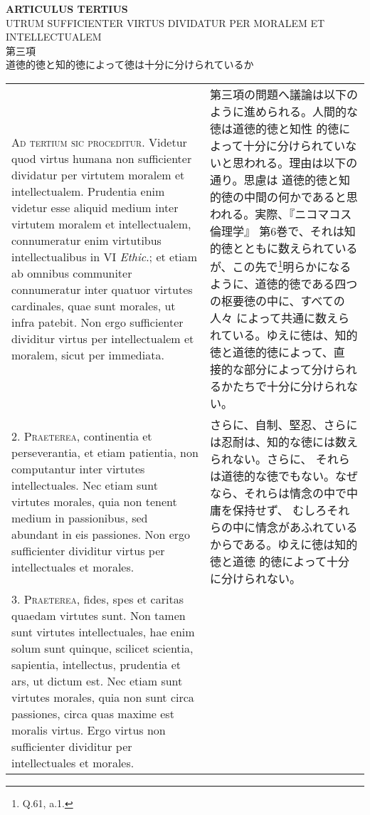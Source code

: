 \documentclass[10pt]{jsarticle}
\begin{document}
\begin{center}
{\Large {\bf ARTICULUS TERTIUS}}\\
{\large UTRUM SUFFICIENTER VIRTUS DIVIDATUR PER MORALEM ET INTELLECTUALEM}\\
{\Large 第三項\\道徳的徳と知的徳によって徳は十分に分けられているか}
\end{center}

\begin{longtable}{p{21em}p{21em}}
{\scshape Ad tertium sic proceditur}. Videtur quod virtus humana non
sufficienter dividatur per virtutem moralem et
intellectualem. Prudentia enim videtur esse aliquid medium inter
virtutem moralem et intellectualem, connumeratur enim virtutibus
intellectualibus in VI {\itshape Ethic}.; et etiam ab omnibus
communiter connumeratur inter quatuor virtutes cardinales, quae sunt
morales, ut infra patebit. Non ergo sufficienter dividitur virtus per
intellectualem et moralem, sicut per immediata.

&

第三項の問題へ議論は以下のように進められる。人間的な徳は道徳的徳と知性
的徳によって十分に分けられていないと思われる。理由は以下の通り。思慮は
道徳的徳と知的徳の中間の何かであると思われる。実際、『ニコマコス倫理学』
第6巻で、それは知的徳とともに数えられているが、この先で\footnote{Q.61,
a.1.}明らかになるように、道徳的徳である四つの枢要徳の中に、すべての人々
によって共通に数えられている。ゆえに徳は、知的徳と道徳的徳によって、直
接的な部分によって分けられるかたちで十分に分けられない。

\\



2. {\scshape Praeterea}, continentia et perseverantia, et etiam
patientia, non computantur inter virtutes intellectuales. Nec etiam
sunt virtutes morales, quia non tenent medium in passionibus, sed
abundant in eis passiones. Non ergo sufficienter dividitur virtus per
intellectuales et morales.

&

さらに、自制、堅忍、さらには忍耐は、知的な徳には数えられない。さらに、
それらは道徳的な徳でもない。なぜなら、それらは情念の中で中庸を保持せず、
むしろそれらの中に情念があふれているからである。ゆえに徳は知的徳と道徳
的徳によって十分に分けられない。

\\



3. {\scshape Praeterea}, fides, spes et caritas quaedam virtutes
sunt. Non tamen sunt virtutes intellectuales, hae enim solum sunt
quinque, scilicet scientia, sapientia, intellectus, prudentia et ars,
ut dictum est. Nec etiam sunt virtutes morales, quia non sunt circa
passiones, circa quas maxime est moralis virtus. Ergo virtus non
sufficienter dividitur per intellectuales et morales.


\end{longtable}
\end{document}
